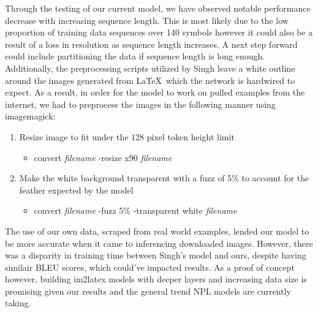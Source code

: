 \documentclass[12pt]{article}
\begin{document}
Through the testing of our current model, we have observed notable performance
decrease with increasing sequence length. This is most likely due to the low
proportion of training data sequences over 140 symbols however it could also be
a result of a loss in resolution as sequence length increases. A next step
forward could include partitioning the data if sequence length is long enough.
Additionally, the preprocessing scripts utilized by
Singh \parencite{singh2018teaching} leave a white outline around the images generated
from \LaTeX\ which the network is hardwired to expect. As a result, in order for
the model to work on pulled examples from the internet, we had to preprocess the
images in the following manner using imagemagick:
\begin{enumerate}
  \item Resize image to fit under the 128 pixel token height limit
  \begin{itemize}
    \item convert \textit{filename} -resize x90 \textit{filename}
  \end{itemize}
  \item Make the white background transparent with a fuzz of 5\% to account for
  the feather expected by the model
  \begin{itemize}
    \item convert \textit{filename} -fuzz 5\% -transparent white \textit{filename}
  \end{itemize} 
\end{enumerate}
The use of our own data, scraped from real world examples, lended our model to be
more accurate when it came to inferencing downloaded images. However, there was
a disparity in training time between Singh's model and ours, despite having
similair BLEU scores, which could've impacted results. As a proof of concept
however, building im2latex models with deeper layers and increasing data size is
promising given our results and the general trend NPL models are currently taking.




\printbibliography{}
\end{document}
